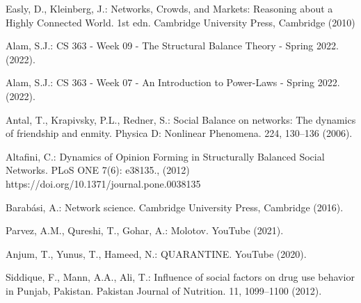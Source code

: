 \documentclass[runningheads]{llncs}
\begin{document}
\begin{thebibliography}{8}






Easly, D., Kleinberg, J.: Networks, Crowds, and Markets: Reasoning about a Highly Connected World. 1st edn. Cambridge University Press,
Cambridge (2010)

Alam, S.J.: CS 363 - Week 09 - The Structural Balance Theory - Spring 2022. (2022). 

Alam, S.J.: CS 363 - Week 07 - An Introduction to Power-Laws - Spring 2022. (2022). 

Antal, T., Krapivsky, P.L., Redner, S.: Social Balance on networks: The dynamics of friendship and enmity. Physica D: Nonlinear Phenomena. 224, 130–136 (2006).

Altafini, C.: Dynamics of Opinion Forming in Structurally Balanced Social Networks. PLoS ONE 7(6): e38135., (2012) https://doi.org/10.1371/journal.pone.0038135

Barabási, A.: Network science. Cambridge University Press, Cambridge (2016).

Parvez, A.M., Qureshi, T., Gohar, A.: Molotov. YouTube (2021). 

Anjum, T., Yunus, T., Hameed, N.: QUARANTINE. YouTube (2020). 

Siddique, F., Mann, A.A., Ali, T.: Influence of social factors on drug use behavior in Punjab, Pakistan. Pakistan Journal of Nutrition. 11, 1099–1100 (2012). 
\end{thebibliography}
\end{document}
